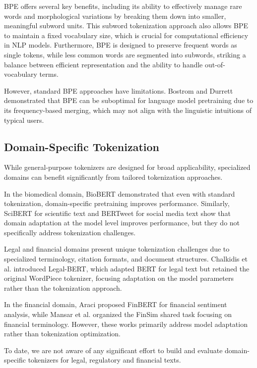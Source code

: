 BPE offers several key benefits, including its ability to effectively manage rare words and morphological variations by breaking them down into smaller, meaningful subword units.  This subword tokenization approach also allows BPE to maintain a fixed vocabulary size, which is crucial for computational efficiency in NLP models.  Furthermore, BPE is designed to preserve frequent words as single tokens, while less common words are segmented into subwords, striking a balance between efficient representation and the ability to handle out-of-vocabulary terms.  

However, standard BPE approaches have limitations. Bostrom and Durrett \cite{bostrom2020byte} demonstrated that BPE can be suboptimal for language model pretraining due to its frequency-based merging, which may not align with the linguistic intuitions of typical users. 

\subsection{Domain-Specific Tokenization}

While general-purpose tokenizers are designed for broad applicability, specialized domains can benefit significantly from tailored tokenization approaches.

In the biomedical domain, BioBERT \cite{lee2020biobert} demonstrated that even with standard tokenization, domain-specific pretraining improves performance. Similarly, SciBERT \cite{beltagy2019scibert} for scientific text and BERTweet \cite{nguyen2020bertweet} for social media text show that domain adaptation at the model level improves performance, but they do not specifically address tokenization challenges.

Legal and financial domains present unique tokenization challenges due to specialized terminology, citation formats, and document structures. Chalkidis et al. \cite{chalkidis2020legal} introduced Legal-BERT, which adapted BERT for legal text but retained the original WordPiece tokenizer, focusing adaptation on the model parameters rather than the tokenization approach.

In the financial domain, Araci \cite{araci2019finbert} proposed FinBERT for financial sentiment analysis, while Mansar et al. \cite{mansar2021finsim} organized the FinSim shared task focusing on financial terminology. However, these works primarily address model adaptation rather than tokenization optimization.

To date, we are not aware of any significant effort to build and evaluate domain-specific tokenizers for legal, regulatory and financial texts.  

